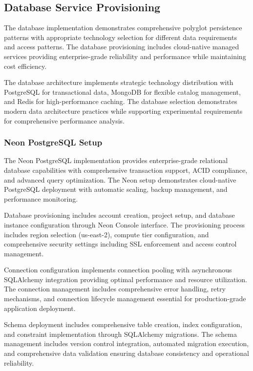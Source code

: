 \subsection{Database Service Provisioning}

The database implementation demonstrates comprehensive polyglot persistence patterns with appropriate technology selection for different data requirements and access patterns. The database provisioning includes cloud-native managed services providing enterprise-grade reliability and performance while maintaining cost efficiency.

The database architecture implements strategic technology distribution with PostgreSQL for transactional data, MongoDB for flexible catalog management, and Redis for high-performance caching. The database selection demonstrates modern data architecture practices while supporting experimental requirements for comprehensive performance analysis.

\subsubsection{Neon PostgreSQL Setup}

The Neon PostgreSQL implementation provides enterprise-grade relational database capabilities with comprehensive transaction support, ACID compliance, and advanced query optimization. The Neon setup demonstrates cloud-native PostgreSQL deployment with automatic scaling, backup management, and performance monitoring.

Database provisioning includes account creation, project setup, and database instance configuration through Neon Console interface. The provisioning process includes region selection (us-east-2), compute tier configuration, and comprehensive security settings including SSL enforcement and access control management.

Connection configuration implements connection pooling with asynchronous SQLAlchemy integration providing optimal performance and resource utilization. The connection management includes comprehensive error handling, retry mechanisms, and connection lifecycle management essential for production-grade application deployment.

Schema deployment includes comprehensive table creation, index configuration, and constraint implementation through SQLAlchemy migrations. The schema management includes version control integration, automated migration execution, and comprehensive data validation ensuring database consistency and operational reliability.

